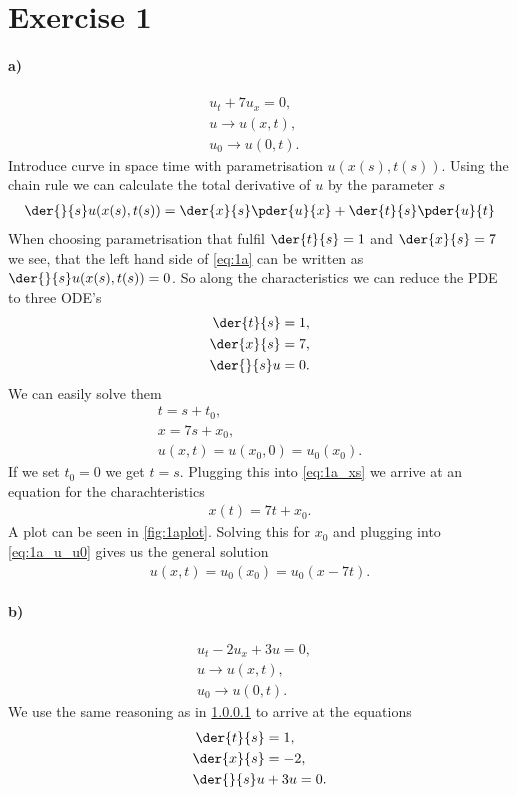 \section{Exercise 1}
\paragraph{a)}\label{par:a}
\begin{align}
u_t + 7u_x=0,&\label{eq:1a}\\
u \rightarrow u(x,t),&\\
u_0 \rightarrow u(0,t).&
\end{align}
Introduce curve in space time with parametrisation $u(x(s),t(s))$. Using the chain rule we can calculate the total derivative of $u$  by the parameter $s$
\begin{align}
\der{}{s}u(x(s),t(s)) = \der{x}{s}\pder{u}{x} + \der{t}{s}\pder{u}{t}
\end{align}
When choosing parametrisation that fulfil $\der{t}{s} = 1$ and $\der{x}{s}=7$ we see, that the left hand side  of  \cref{eq:1a} can be written as $\der{}{s}u(x(s),t(s))=0$.
So along the characteristics we can reduce the  PDE to three ODE's 
\begin{align}
\der{t}{s} &= 1,\\
\der{x}{s}&=7,\\
\der{}{s}u&=0.
\end{align}
We can easily solve them
\begin{align}
t=s +t_0,\\
x = 7s + x_0,\label{eq:1a_xs}\\
u(x,t) = u(x_0, 0) =u_0(x_0)\label{eq:1a_u_u0} .
\end{align}
If we set $t_0=0$ we get $t=s$. Plugging this into \cref{eq:1a_xs} we arrive at an equation for the charachteristics 
\begin{align}
x(t) = 7t + x_0.\label{eq:1a_charch_curve}
\end{align}
A plot can be seen in \cref{fig:1aplot}.
Solving this for $x_0$ and plugging into \cref{eq:1a_u_u0} gives us the general solution
\begin{align}
u(x,t)=u_0(x_0)=u_0(x-7t).
\end{align}

\paragraph{b)}
\begin{align}
u_t - 2u_x +3u=0,&\label{eq:1a}\\
u \rightarrow u(x,t),&\\
u_0 \rightarrow u(0,t).&
\end{align}
We use the same reasoning as in \cref{par:a} to arrive at the equations
\begin{align}
\der{t}{s} &= 1,\\
\der{x}{s}&=-2,\\
\der{}{s}u&+3u=0.\label{eq:1b_difu}
\end{align}

